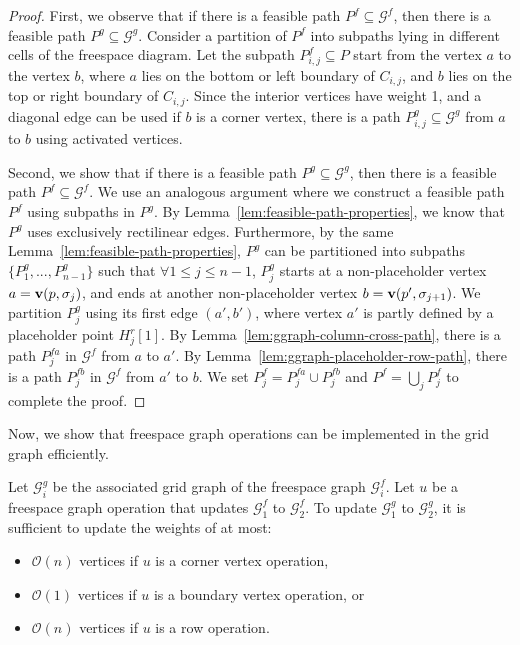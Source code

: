\documentclass[thm-restate]{lipics-v2021}
\theoremstyle{remark}
\newcommand{\Oh}{\mathcal{O}}
\newcommand{\graph}[0]{\mathcal{G}}
\newcommand{\vertex}[1]{\normalfont \textbf{v}(#1)}
\newcommand{\fsgraph}[0]{\graph^{f}}
\newcommand{\cell}[1]{C_{#1}}
\newcommand{\ggraph}[0]{\graph^g}
\begin{document}
\begin{proof}
    First, we observe that if there is a feasible path $P^f \subseteq \fsgraph$, then there is a feasible path $P^g \subseteq \ggraph$. 
    Consider a partition of $P^f$ into subpaths lying in different cells of the freespace diagram. Let the subpath $P^f_{i, j} \subseteq P$ start from the vertex $a$ to the vertex $b$, where $a$ lies on the bottom or left boundary of $\cell{i, j}$, and $b$ lies on the top or right boundary of $\cell{i, j}$. Since the interior vertices have weight 1, and a diagonal edge can be used if $b$ is a corner vertex, there is a path $P^g_{i, j} \subseteq \ggraph$ from $a$ to $b$ using activated vertices. 

    Second, we show that if there is a feasible path $P^g \subseteq \ggraph$, then there is a feasible path $P^f \subseteq \fsgraph$. We use an analogous argument where we construct a feasible path $P^f$ using subpaths in $P^g$. By Lemma~\ref{lem:feasible-path-properties}, we know that $P^g$ uses exclusively rectilinear edges. Furthermore, by the same Lemma~\ref{lem:feasible-path-properties}, $P^g$ can be partitioned into subpaths $\{P^g_1, ..., P^g_{n - 1}\}$ such that $\forall 1 \leq j \leq n - 1$, $P^g_j$ starts at a non-placeholder vertex $a = \vertex{p, \sigma_j}$, and ends at another non-placeholder vertex $b = \vertex{p', \sigma_{j + 1}}$. We partition $P^g_j$ using its first edge $(a', b')$, where vertex $a'$ is partly defined by a placeholder point $H^r_j[1]$. By Lemma~\ref{lem:ggraph-column-cross-path}, there is a path $P_j^{fa}$ in $\fsgraph$ from $a$ to $a'$. By Lemma~\ref{lem:ggraph-placeholder-row-path}, there is a path $P_j^{fb}$ in $\fsgraph$ from $a'$ to $b$. We set $P^f_j = P^{fa}_j \cup P^{fb}_j$ and $P^f = \bigcup_{j} P^f_j$ to complete the proof.  
\end{proof}

Now, we show that freespace graph operations can be implemented in the grid graph efficiently. 
\begin{lemma} \label{lem:ggraph-number-of-update-per-op}
    Let $\ggraph_i$ be the associated grid graph of the freespace graph $\fsgraph_i$. Let $u$ be a freespace graph operation that updates $\fsgraph_1$ to $\fsgraph_2$. To update $\ggraph_1$ to $\ggraph_2$, it is sufficient to update the weights of at most: 
    \begin{itemize}
        \item $\Oh(n)$ vertices if $u$ is a corner vertex operation,
        \item $\Oh(1)$ vertices if $u$ is a boundary vertex operation, or
        \item $\Oh(n)$ vertices if $u$ is a row operation. 
    \end{itemize}
\end{lemma}
\end{document}
